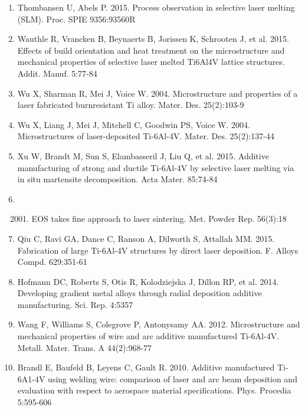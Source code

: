 \documentclass[10pt]{article}
\begin{document}
\begin{enumerate}
  \item Thombansen U, Abels P. 2015. Process observation in selective laser melting (SLM). Proc. SPIE 9356:93560R

  \item Wauthle R, Vrancken B, Beynaerts B, Jorissen K, Schrooten J, et al. 2015. Effects of build orientation and heat treatment on the microstructure and mechanical properties of selective laser melted Ti6Al4V lattice structures. Addit. Manuf. 5:77-84

  \item Wu X, Sharman R, Mei J, Voice W. 2004. Microstructure and properties of a laser fabricated burnresistant Ti alloy. Mater. Des. 25(2):103-9

  \item Wu X, Liang J, Mei J, Mitchell C, Goodwin PS, Voice W. 2004. Microstructures of laser-deposited Ti-6Al-4V. Mater. Des. 25(2):137-44

  \item Xu W, Brandt M, Sun S, Elambasseril J, Liu Q, et al. 2015. Additive manufacturing of strong and ductile Ti-6Al-4V by selective laser melting via in situ martensite decomposition. Acta Mater. 85:74-84

  \item 
  \begin{enumerate}
    \setcounter{enumii}{2000}
    \item EOS takes fine approach to laser sintering. Met. Powder Rep. 56(3):18
  \end{enumerate}
  \item Qiu C, Ravi GA, Dance C, Ranson A, Dilworth S, Attallah MM. 2015. Fabrication of large Ti-6Al-4V structures by direct laser deposition. F. Alloys Compd. 629:351-61

  \item Hofmann DC, Roberts S, Otis R, Kolodziejska J, Dillon RP, et al. 2014. Developing gradient metal alloys through radial deposition additive manufacturing. Sci. Rep. 4:5357

  \item Wang F, Williams S, Colegrove P, Antonysamy AA. 2012. Microstructure and mechanical properties of wire and arc additive manufactured Ti-6Al-4V. Metall. Mater. Trans. A 44(2):968-77

  \item Brandl E, Baufeld B, Leyens C, Gault R. 2010. Additive manufactured Ti-6A1-4V using welding wire: comparison of laser and arc beam deposition and evaluation with respect to aerospace material specifications. Phys. Procedia 5:595-606


\end{enumerate}
\end{document}
